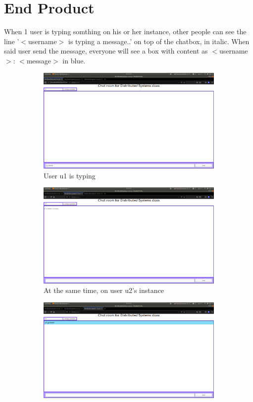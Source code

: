 \documentclass[11pt,a4paper]{article}
\begin{document}
	\section{End Product}
	When 1 user is typing somthing on his or her instance, other people can see the line '$<$username$>$ is typing a message..' on top of the chatbox, in italic. When said user send the message, everyone will see a box with content as $<$username$>$: $<$message$>$ in blue.
	\begin{figure}[h!]
		\centering
  		\begin{subfigure}[b]{0.4\linewidth}
  		\includegraphics[width=\linewidth]{u1-type-notsend.png}
    		\caption{User u1 is typing}
  		\end{subfigure}
  		\begin{subfigure}[b]{0.4\linewidth}
    		\includegraphics[width=\linewidth]{u2-notsend.png}
    		\caption{At the same time, on user u2's instance}
  		\end{subfigure}
  		\begin{subfigure}[b]{0.4\linewidth}
    		\includegraphics[width=\linewidth]{u3-aftersend.png}

\end{subfigure}
\end{figure}
\end{document}
